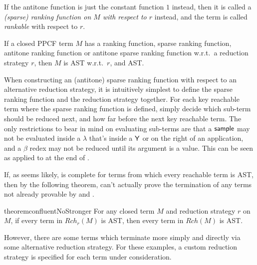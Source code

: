 If the antitone function is just the constant function $1$ instead, then it is called a \emph{(sparse) ranking function on $M$ with respect to $r$} instead, and the term is called \emph{rankable} with respect to $r$.

\begin{theorem} \label{thm:confluent ranking}
If a closed PPCF term $M$ has a ranking function, sparse ranking function, antitone ranking function or antitone sparse ranking function w.r.t.~a reduction strategy $r$, then $M$ is AST w.r.t.~$r$, and AST.
\end{theorem}

When constructing an (antitone) sparse ranking function with respect to an alternative reduction strategy, it is intuitively simplest to define the sparse ranking function and the reduction strategy together. For each key reachable term where the sparse ranking function is defined, simply decide which sub-term should be reduced next, and how far before the next key reachable term. The only restrictions to bear in mind on evaluating sub-terms are that a $\mathsf{sample}$ may not be evaluated inside a $\lambda$ that's inside a $\mathsf{Y}$ or on the right of an application, and a $\beta$ redex may not be reduced until its argument is a value. This can be seen as applied to  at the end of .

\medskip
If, as seems likely,  is complete for terms from which every reachable term is AST, then by the following theorem,  can't actually prove the termination of any terms not already provable by  and .

\begin{restatable}{theorem}{confluentNoStronger}
\label{thm:confluentNoStronger}
For any closed term $M$ and reduction strategy $r$ on $M$, if every term in $\mathit{Rch}_r(M)$ is AST, then every term in $\mathit{Rch}(M)$ is AST.
\end{restatable}

However, there are some terms which terminate more simply and directly via some alternative reduction strategy. For these examples, a custom reduction strategy is specified for each term under consideration.

